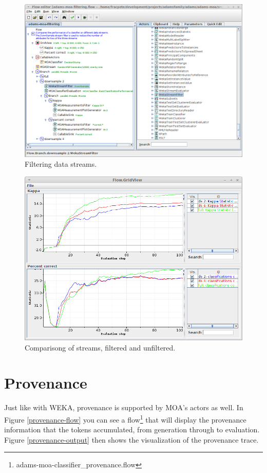 \documentclass[a4paper]{book}
\begin{document}
\begin{figure}[htb]
  \centering
  \includegraphics[width=12.0cm]{images/moa-stream-filtering_flow.png}
  \caption{Filtering data streams.}
  \label{moa-stream-filtering_flow}
\end{figure}

\begin{figure}[htb]
  \centering
  \includegraphics[width=12.0cm]{images/moa-stream-filtering_output.png}
  \caption{Comparisong of streams, filtered and unfiltered.}
  \label{moa-stream-filtering_output}
\end{figure}

\clearpage
\newpage
\section{Provenance}
Just like with WEKA, provenance is supported by MOA's actors as well.
In Figure \ref{provenance-flow} you can see a 
flow\footnote{adams-moa-classifier\_provenance.flow} that will display the
provenance information that the tokens accumulated, from generation through 
to evaluation. Figure \ref{provenance-output} then shows the visualization
of the provenance trace.
\end{document}
